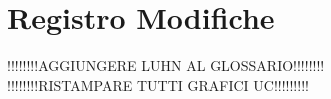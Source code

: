 \documentclass[12pt,a4paper,titlepage]{article}
\begin{document}
	
	
	\clearpage %
	
	
	
	\chead{}
	\cfoot{}
	\renewcommand{\headrulewidth}{0.2pt}
	\renewcommand{\footrulewidth}{0.2pt}
	\renewcommand{\headrulewidth}{0.2pt}
	\renewcommand{\footrulewidth}{0.2pt}
	\section{Registro Modifiche}
	 !!!!!!!!AGGIUNGERE LUHN AL GLOSSARIO!!!!!!!! \\
	 !!!!!!!!RISTAMPARE TUTTI GRAFICI UC!!!!!!!!!
	\small %
		
\end{document}
